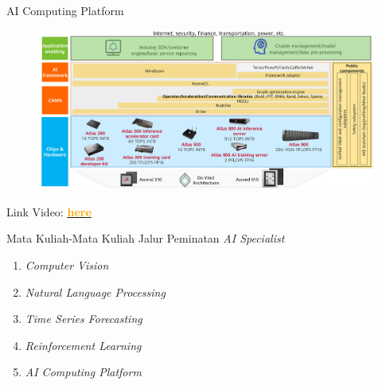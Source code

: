 \documentclass[pdf]{beamer}
\theoremstyle{mystyle}
\begin{document}
\begin{frame}{AI Computing Platform}
	\begin{figure}[!ht]
		\centering
		\includegraphics[scale=.2]{huawei-computing-platform}
	\end{figure}				
	Link Video: \href{https://drive.google.com/file/d/1e94HC381qGUsyLEfsxpE5o4btTd59HWZ/view?usp=sharing}{\textcolor{orange}{\textbf{here}}}	
\end{frame}



\begin{frame}{Mata Kuliah-Mata Kuliah Jalur Peminatan \textit{AI Specialist}}
	\begin{enumerate}
		\item \textit{Computer Vision}
		\bigskip
		\item \textit{Natural Language Processing}
		\bigskip
		\item \textit{Time Series Forecasting}
		\bigskip
		\item \textit{Reinforcement Learning}
		\bigskip		
		\item \textit{AI Computing Platform}
	\end{enumerate}	
\end{frame}












\end{document}
